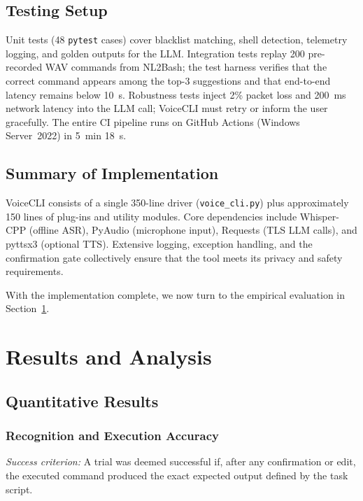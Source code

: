 \documentclass[a4paper,12pt]{article}
\begin{document}
\subsection{Testing Setup}
\label{sec:testing}
\noindent Unit tests (48 \texttt{pytest} cases) cover blacklist matching, shell detection, telemetry logging, and golden outputs for the LLM. Integration tests replay 200 pre-recorded WAV commands from NL2Bash; the test harness verifies that the correct command appears among the top-3 suggestions and that end-to-end latency remains below 10~s. Robustness tests inject 2\% packet loss and 200~ms network latency into the LLM call; VoiceCLI must retry or inform the user gracefully. The entire CI pipeline runs on GitHub Actions (Windows Server~2022) in 5~min 18~s.

\subsection{Summary of Implementation}
\noindent VoiceCLI consists of a single 350-line driver (\texttt{voice\_cli.py}) plus approximately 150 lines of plug-ins and utility modules. Core dependencies include Whisper-CPP (offline ASR), PyAudio (microphone input), Requests (TLS LLM calls), and pyttsx3 (optional TTS). Extensive logging, exception handling, and the confirmation gate collectively ensure that the tool meets its privacy and safety requirements.

With the implementation complete, we now turn to the empirical evaluation in Section~\ref{sec:results}.
\newpage







\newpage
\section{Results and Analysis}
\label{sec:results}

\subsection{Quantitative Results}

\subsubsection{Recognition and Execution Accuracy}
\textit{Success criterion:} A trial was deemed successful if, after any confirmation or edit, the executed command produced the exact expected output defined by the task script.
\end{document}
